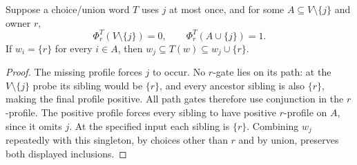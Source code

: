 \begin{lemma}\label{core:lem:mandatory-linear-source}
Suppose a choice/union word $T$ uses $j$ at most once, and for some
$A\subseteq V\setminus\{j\}$ and owner $r$,
\[
 \Phi_r^T(V\setminus\{j\})=0,\qquad \Phi_r^T(A\cup\{j\})=1.
\]
If $w_i=\{r\}$ for every $i\in A$, then
$w_j\subseteq T(w)\subseteq w_j\cup\{r\}$.
\end{lemma}
\begin{proof}
The missing profile forces $j$ to occur. No $r$-gate lies on its path:
at the $V\setminus\{j\}$ probe its sibling would be $\{r\}$, and
every ancestor sibling is also $\{r\}$, making the final profile positive.
All path gates therefore use conjunction in the $r$-profile.
The positive profile forces every sibling to have positive $r$-profile
on $A$, since it omits $j$. At the specified input each sibling is
$\{r\}$. Combining $w_j$ repeatedly with this singleton, by choices
other than $r$ and by union, preserves both displayed inclusions.
\end{proof}


